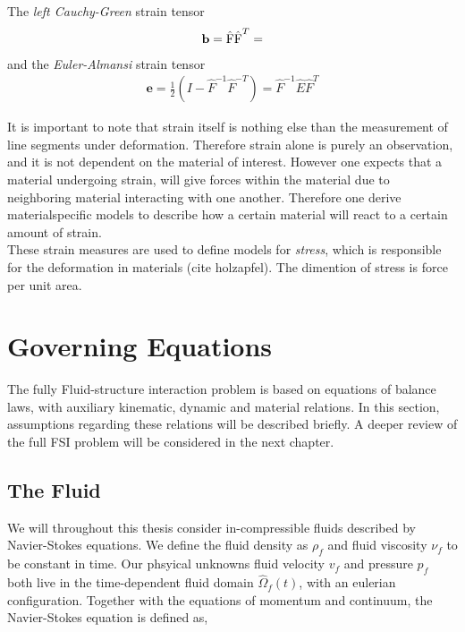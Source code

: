 The \textit{left Cauchy-Green} strain tensor 
\begin{align*}
\mathbf{b} = \text{\^{F}} \text{\^{F}}^T = 
\end{align*}
and the \textit{Euler-Almansi} strain tensor
\begin{align*}
\mathbf{e} = \frac{1}{2} (I - \hat{F}^{-1}\hat{F}^{-T}) = \hat{F}^{-1}\hat{E}\hat{F}^{T}
\end{align*}

It is important to note that strain itself is nothing else than the measurement of line segments under deformation. Therefore strain alone is purely an observation, and it is not dependent on the material of interest. However one expects that a material undergoing strain, will give  forces within the material due to neighboring material interacting with one another. Therefore one derive materialspecific models to describe how a certain material will react to a certain amount of strain.\\
These strain measures are used to define models for \textit{stress}, which is responsible for the deformation in materials (cite holzapfel). The dimention of stress is force per unit area.

\section{Governing Equations}
The fully Fluid-structure interaction problem is based on equations of balance laws, with auxiliary kinematic, dynamic and material relations. In this section, assumptions regarding these relations will be described briefly. A deeper review of the full FSI problem will be considered in the next chapter. 

\subsection{The Fluid}
We will throughout this thesis consider in-compressible fluids described by Navier-Stokes equations. We define the fluid density as $\rho_f$ and fluid viscosity $\nu_f$ to be constant in time. Our phsyical unknowns
fluid velocity $v_f$ and pressure $p_f$ both live in the time-dependent fluid domain  $\hat{\Omega}_f(t)$, with an eulerian configuration. Together with the equations of momentum and continuum, the Navier-Stokes equation is defined as,

